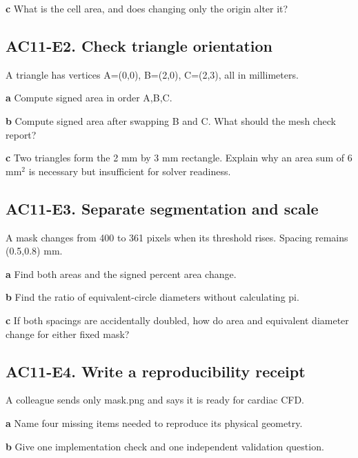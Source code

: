 \documentclass[11pt,letterpaper]{article}
\theoremstyle{definition}\newtheorem{definition}{Definition}\newtheorem{example}{Example}
\numberwithin{equation}{section}
\begin{document}
\textbf{c} What is the cell area, and does changing only the origin alter it?

\par\noindent\begin{minipage}{\linewidth}
\subsection*{AC11-E2. Check triangle orientation}
A triangle has vertices A=\allowbreak{}(0,0), B=\allowbreak{}(2,0), C=\allowbreak{}(2,3), all in millimeters.

\textbf{a} Compute signed area in order A,B,C.

\end{minipage}\par\medskip
\textbf{b} Compute signed area after swapping B and C. What should the mesh check report?

\textbf{c} Two triangles form the 2 mm by 3 mm rectangle. Explain why an area sum of 6 mm$^2$ is necessary but insufficient for solver readiness.

\par\noindent\begin{minipage}{\linewidth}
\subsection*{AC11-E3. Separate segmentation and scale}
A mask changes from 400 to 361 pixels when its threshold rises. Spacing remains (0.5,0.8) mm.

\textbf{a} Find both areas and the signed percent area change.

\end{minipage}\par\medskip
\textbf{b} Find the ratio of equivalent-circle diameters without calculating pi.

\textbf{c} If both spacings are accidentally doubled, how do area and equivalent diameter change for either fixed mask?

\par\noindent\begin{minipage}{\linewidth}
\subsection*{AC11-E4. Write a reproducibility receipt}
A colleague sends only mask.png and says it is ready for cardiac CFD.

\textbf{a} Name four missing items needed to reproduce its physical geometry.

\end{minipage}\par\medskip
\textbf{b} Give one implementation check and one independent validation question.
\end{document}
